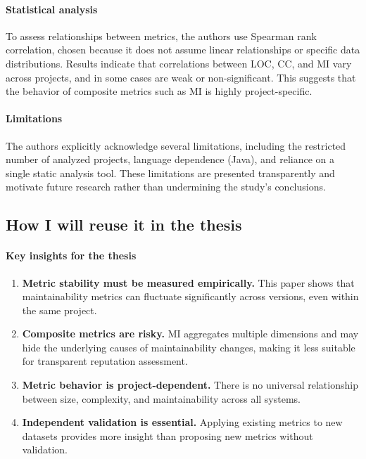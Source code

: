 \documentclass[11pt,a4paper]{article}
\begin{document}
\paragraph{Statistical analysis}
To assess relationships between metrics, the authors use Spearman rank correlation, chosen because it does not assume linear relationships or specific data distributions. Results indicate that correlations between LOC, CC, and MI vary across projects, and in some cases are weak or non-significant. This suggests that the behavior of composite metrics such as MI is highly project-specific.

\paragraph{Limitations}
The authors explicitly acknowledge several limitations, including the restricted number of analyzed projects, language dependence (Java), and reliance on a single static analysis tool. These limitations are presented transparently and motivate future research rather than undermining the study's conclusions.

\subsection{How I will reuse it in the thesis}
\paragraph{Key insights for the thesis}
\begin{enumerate}[leftmargin=*]
  \item \textbf{Metric stability must be measured empirically.} This paper shows that maintainability metrics can fluctuate significantly across versions, even within the same project.
  \item \textbf{Composite metrics are risky.} MI aggregates multiple dimensions and may hide the underlying causes of maintainability changes, making it less suitable for transparent reputation assessment.
  \item \textbf{Metric behavior is project-dependent.} There is no universal relationship between size, complexity, and maintainability across all systems.
  \item \textbf{Independent validation is essential.} Applying existing metrics to new datasets provides more insight than proposing new metrics without validation.
\end{enumerate}
\end{document}
